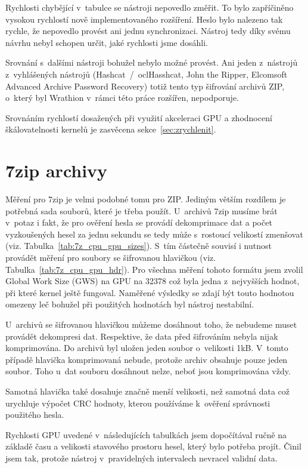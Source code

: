 \shorthandon{-}
\noindent Rychlosti chybějící v~tabulce se nástroji nepovedlo změřit. To bylo zapříčiněno vysokou
rychlostí nově implementovaného rozšíření. Heslo bylo nalezeno tak rychle, že nepovedlo provést
ani jednu synchronizaci. Nástroj tedy díky svému návrhu nebyl schopen určit, jaké rychlosti jsme
dosáhli.

Srovnání s~dalšími nástroji bohužel nebylo možné provést. Ani jeden z~nástrojů z~vyhlášených
nástrojů (Hashcat~/~oclHasshcat, John the Ripper, Elcomsoft Advanced Archive Password Recovery)
totiž tento typ šifrování archivů ZIP, o~který byl Wrathion v~rámci této práce rozšířen,
nepodporuje.

Srovnáním rychlostí dosažených při využití akceleraci GPU a zhodnocení škálovatelnosti kernelů je
zasvěcena sekce~\ref{sec:zrychlenit}.

\section{7zip archivy}
Měření pro 7zip je velmi podobné tomu pro ZIP. Jediným větším rozdílem je potřebná sada souborů, které
je třeba použít. U~archivů 7zip musíme brát v~potaz i fakt, že pro ověření hesla se provádí
dekomprimace dat a počet vyzkoušených hesel za jednu sekundu se tedy může s~rostoucí velikostí
zmenšovat (viz. Tabulka~\ref{tab:7z_cpu_gpu_sizes}). S~tím částečně souvisí i nutnost provádět
měření pro soubory se šifrovanou hlavičkou (viz. Tabulka~\ref{tab:7z_cpu_gpu_hdr}). Pro všechna
měření tohoto formátu jsem zvolil Global Work Size (GWS) na GPU na 32378 což byla jedna
z~nejvyšších hodnot, při které kernel ještě fungoval. Naměřené výsledky se zdají být touto hodnotou
omezeny leč bohužel při použitých hodnotách byl nástroj nestabilní.

U~archivů se šifrovanou hlavičkou můžeme dosáhnout toho, že nebudeme muset provádět dekompresi
dat. Respektive, že data před šifrováním nebyla nijak komprimována. Do archivů byl uložen
jeden soubor o~velikosti 1kB. V~tomto případě hlavička komprimovaná nebude, protože archiv
obsahuje pouze jeden soubor. Toho u~dat souboru dosáhnout nelze, neboť jsou komprimována vždy.

Samotná hlavička také dosahuje značně menší velikosti, než samotná data což urychluje výpočet CRC
hodnoty, kterou používáme k~ověření správnosti použitého hesla.

Rychlosti GPU uvedené v~následujících tabulkách jsem dopočítával ručně na základě času a
velikosti stavového prostoru hesel, který bylo potřeba projít. Činil jsem tak, protože nástroj
v~pravidelných intervalech nevracel validní data.

